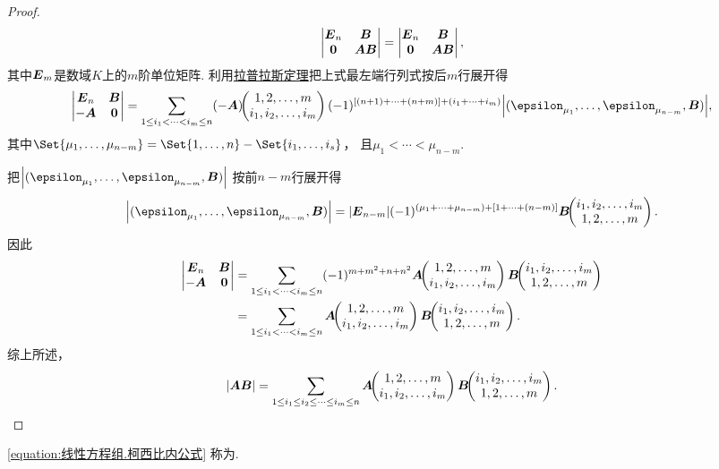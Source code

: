 \begin{theorem}
\begin{proof}
\[\begin{vmatrix}
		\boldsymbol{E}_n & \boldsymbol{B} \\
		\boldsymbol0 & \boldsymbol{A}\boldsymbol{B}
	\end{vmatrix}
	= \begin{vmatrix}
		\boldsymbol{E}_n & \boldsymbol{B} \\
		\boldsymbol0 & \boldsymbol{A}\boldsymbol{B}
	\end{vmatrix},
\]
其中\(\boldsymbol{E}_m\)是数域\(K\)上的\(m\)阶单位矩阵.
利用\hyperref[theorem:行列式.拉普拉斯定理]{拉普拉斯定理}把上式最左端行列式按后\(m\)行展开得\[
	\begin{vmatrix}
		\vb{E}_n & \vb{B} \\
		-\vb{A} & \vb0
	\end{vmatrix}
	= \sum_{1 \leq i_1 < \dotsb < i_m \leq n}
	\MatrixMinor{(-\vb{A})}{
		1,2,\dotsc,m \\
		i_1,i_2,\dotsc,i_m
	}
	(-1)^{[(n+1)+\dotsb+(n+m)]+(i_1+\dotsb+i_m)}
	\abs{(\vb\epsilon_{\mu_1},\dotsc,\vb\epsilon_{\mu_{n-m}},\vb{B})},
\]
其中\(\Set{\mu_1,\dotsc,\mu_{n-m}}
= \Set{1,\dotsc,n}-\Set{i_1,\dotsc,i_s}\)，
且\(\mu_1<\dotsb<\mu_{n-m}\).

把\(\abs{(\vb\epsilon_{\mu_1},\dotsc,\vb\epsilon_{\mu_{n-m}},\vb{B})}\)
按前\(n-m\)行展开得\[
	\abs{(\vb\epsilon_{\mu_1},\dotsc,\vb\epsilon_{\mu_{n-m}},\vb{B})}
	= \abs{\vb{E}_{n-m}}
	(-1)^{(\mu_1+\dotsb+\mu_{n-m})+[1+\dotsb+(n-m)]}
	\MatrixMinor{\vb{B}}{
		i_1,i_2,\dotsc,i_m \\
		1,2,\dotsc,m
	}.
\]
因此\begin{align*}
	\begin{vmatrix}
		\boldsymbol{E}_n & \boldsymbol{B} \\
		-\boldsymbol{A} & \boldsymbol0
	\end{vmatrix}
	&= \sum_{1 \leq i_1 < \dotsb < i_m \leq n}
	(-1)^{m+m^2+n+n^2}
	\boldsymbol{A}\kern-3.8pt\begin{pmatrix}
		1,2,\dotsc,m \\
		i_1,i_2,\dotsc,i_m
	\end{pmatrix}
	\boldsymbol{B}\kern-3.8pt\begin{pmatrix}
		i_1,i_2,\dotsc,i_m \\
		1,2,\dotsc,m
	\end{pmatrix} \\
	&= \sum_{1 \leq i_1 < \dotsb < i_m \leq n}
	\boldsymbol{A}\kern-3.8pt\begin{pmatrix}
		1,2,\dotsc,m \\
		i_1,i_2,\dotsc,i_m
	\end{pmatrix}
	\boldsymbol{B}\kern-3.8pt\begin{pmatrix}
		i_1,i_2,\dotsc,i_m \\
		1,2,\dotsc,m
	\end{pmatrix}.
\end{align*}
综上所述，\[
	\abs{\boldsymbol{A}\boldsymbol{B}}
	= \sum_{1 \leq i_1 \leq i_2 \leq \dotsb \leq i_m \leq n}
	\boldsymbol{A}\kern-3.8pt\begin{pmatrix}
		1,2,\dotsc,m \\
		i_1,i_2,\dotsc,i_m
	\end{pmatrix}
	\boldsymbol{B}\kern-3.8pt\begin{pmatrix}
		i_1,i_2,\dotsc,i_m \\
		1,2,\dotsc,m
	\end{pmatrix}.
	\qedhere
\]
\end{proof}
\end{theorem}
\cref{equation:线性方程组.柯西比内公式} 称为.


